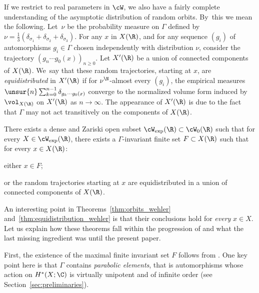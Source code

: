 If we restrict to real parameters in $ \cW$, we
also have a fairly complete understanding
of the asymptotic distribution of random orbits. By~this we mean the following.
Let~$\nu$ be the probability measure on $\Gamma$ defined by
$\nu = \frac{1}{3}(\delta_{\sigma_1}+ \delta_{\sigma_2}+\delta_{\sigma_3})$. For any $x$ in $X(\R)$, and for any sequence $(g_i)$ of
automorphisms $g_i\in \Gamma$ chosen independently with distribution $\nu$, consider the trajectory $(g_n\cdots g_0(x))_{n\geq 0}$.
Let $X'(\R)$ be a union of connected components of $X(\R)$. We~say that these random trajectories, starting at $x$, are \emph{equidistributed} in $X'(\R)$ if for $\nu^\N$-almost every $(g_i)$, the empirical measures
$\unsur{n} \sum_{k=0}^{n-1} \delta_{g_k\cdots g_0(x)}$ converge
to the normalized volume form induced by $\vol_{X(\R)}$ on $X'(\R)$ as $n\to\infty$. The appearance of $X'(\R)$ is due to the fact that $\Gamma$ may not act transitively on the
components of $X(\R)$.

\begin{thm}\label{thm:equidistribution_wehler}
There exists a dense
and Zariski open subset $ \cW_{\mathrm{exp}}(\R)\subset \cW_0(\R)$
such that for {every} $X\in \cW_{\mathrm{exp}}(\R)$, there exists
a $\Gamma$-invariant finite set $F\subset X(\R)$ such that for {every} $x\in X(\R)$:
\begin{enumeratea}
\item\label{thm:equidistribution_wehlera} either $x\in F$;
\item\label{thm:equidistribution_wehlerb} or the random trajectories starting at $x$ are equidistributed in a union of connected components of $X(\R)$.
\end{enumeratea}
\end{thm}

An interesting point in Theorems~\ref{thm:orbits_wehler} and~\ref{thm:equidistribution_wehler} is that their
conclusions hold for \emph{every} $x\in X$. Let us explain how these theorems fall within
the progression of \cite{stiffness, finite_orbits, invariant} and what the last missing ingredient was until the present paper.

First, the existence of the maximal finite invariant set $F$ follows from \cite[Th.\,C]{finite_orbits}. One key point here is that $\Gamma$ contains \emph{parabolic elements}, that is automorphisms whose
action on $H^*(X;\C)$ is virtually unipotent and
of infinite order (see Section~\ref{sec:preliminaries}).


